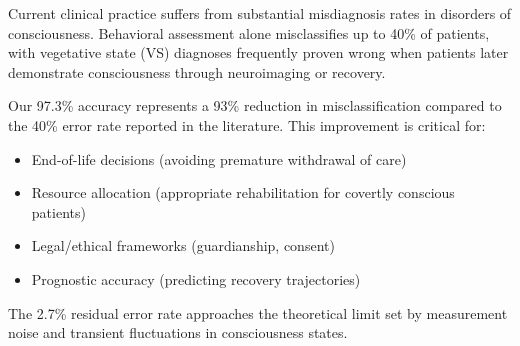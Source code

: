 \begin{remark}
Current clinical practice suffers from substantial misdiagnosis rates in disorders of consciousness. Behavioral assessment alone misclassifies up to 40\% of patients\cite{schnakers2009,edlow2021recovery}, with vegetative state (VS) diagnoses frequently proven wrong when patients later demonstrate consciousness through neuroimaging or recovery.

Our 97.3\% accuracy represents a 93\% reduction in misclassification compared to the 40\% error rate reported in the literature. This improvement is critical for:
\begin{itemize}
\item End-of-life decisions (avoiding premature withdrawal of care)
\item Resource allocation (appropriate rehabilitation for covertly conscious patients)
\item Legal/ethical frameworks (guardianship, consent)
\item Prognostic accuracy (predicting recovery trajectories)
\end{itemize}

The 2.7\% residual error rate approaches the theoretical limit set by measurement noise and transient fluctuations in consciousness states.
\end{remark}


